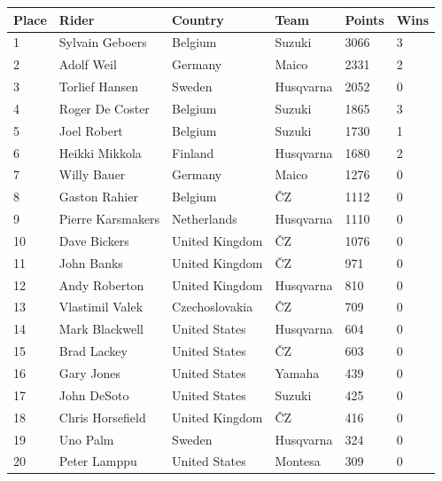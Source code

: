 \documentclass{article}
\begin{document}
\begin{tabular}{llllll}
\toprule
Place & Rider & Country & Team & Points & Wins \\
\midrule
1 & Sylvain Geboers & Belgium & Suzuki & 3066 & 3 \\
2 & Adolf Weil & Germany & Maico & 2331 & 2 \\
3 & Torlief Hansen & Sweden & Husqvarna & 2052 & 0 \\
4 & Roger De Coster & Belgium & Suzuki & 1865 & 3 \\
5 & Joel Robert & Belgium & Suzuki & 1730 & 1 \\
6 & Heikki Mikkola & Finland & Husqvarna & 1680 & 2 \\
7 & Willy Bauer & Germany & Maico & 1276 & 0 \\
8 & Gaston Rahier & Belgium & ČZ & 1112 & 0 \\
9 & Pierre Karsmakers & Netherlands & Husqvarna & 1110 & 0 \\
10 & Dave Bickers & United Kingdom & ČZ & 1076 & 0 \\
11 & John Banks & United Kingdom & ČZ & 971 & 0 \\
12 & Andy Roberton & United Kingdom & Husqvarna & 810 & 0 \\
13 & Vlastimil Valek & Czechoslovakia & ČZ & 709 & 0 \\
14 & Mark Blackwell & United States & Husqvarna & 604 & 0 \\
15 & Brad Lackey & United States & ČZ & 603 & 0 \\
16 & Gary Jones & United States & Yamaha & 439 & 0 \\
17 & John DeSoto & United States & Suzuki & 425 & 0 \\
18 & Chris Horsefield & United Kingdom & ČZ & 416 & 0 \\
19 & Uno Palm & Sweden & Husqvarna & 324 & 0 \\
20 & Peter Lamppu & United States & Montesa & 309 & 0 \\
\bottomrule
\end{tabular}
\end{document}

